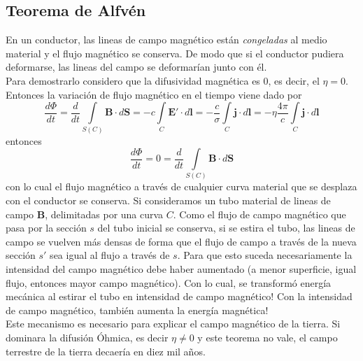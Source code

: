 

\subsection{Teorema de Alfvén}
En un conductor, las lineas de campo magnético están \textit{congeladas} al medio material y el flujo magnético se conserva. De modo que si el conductor pudiera deformarse, las lineas del campo se deformarían junto con él.\\
\indent Para demostrarlo considero que la difusividad magnética es $0$, es decir, el $\eta = 0$. Entonces la variación de flujo magnético en el tiempo viene dado por
\begin{equation*}
    \frac{d \Phi}{dt} =
    \frac{d}{dt}\int\limits_{S(C)} \textbf{B}\cdot d\textbf{S}
    = - c \int\limits_{C}\textbf{E}'\cdot d\textbf{l}
    = -\frac{c}{\sigma} \int\limits_{C}\textbf{j}\cdot d\textbf{l} 
    = -\eta \frac{4\pi}{c}
    \int\limits_{C}\textbf{j}\cdot d\textbf{l}
\end{equation*}
entonces 
\begin{equation*}
    \frac{d\Phi}{dt} = 0
    = \frac{d}{dt}\int\limits_{S(C)}\textbf{B}\cdot d\textbf{S}
\end{equation*}
con lo cual el flujo magnético a través de cualquier curva material que se desplaza con el conductor se conserva. Si consideramos un tubo material de lineas de campo \textbf{B}, delimitadas por una curva $C$. Como el flujo de campo magnético que pasa por la sección $s$ del tubo inicial se conserva, si se estira el tubo, las lineas de campo se vuelven más densas de forma que el flujo de campo a través de la nueva sección $s'$ sea igual al flujo a través de $s$. Para que esto suceda necesariamente la intensidad del campo magnético debe haber aumentado (a menor superficie, igual flujo, entonces mayor campo magnético). Con lo cual, se transformó energía mecánica al estirar el tubo en intensidad de campo magnético! Con la intensidad de campo magnético, también aumenta la energía magnética!\\
\indent Este mecanismo es necesario para explicar el campo magnético de la tierra. Si dominara la difusión Óhmica, es decir $\eta \neq 0$ y este teorema no vale, el campo terrestre de la tierra decaería en diez mil años.




